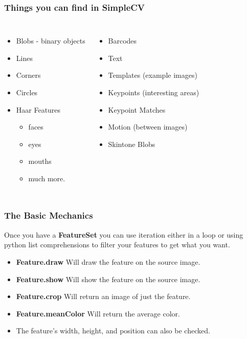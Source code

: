 \documentclass[compress]{beamer}
\begin{document}
\begin{frame}
  \frametitle{Things you can find in SimpleCV}

  \begin{columns}[c] %

    \begin{itemize}
    \item Blobs - binary objects
    \item Lines
    \item Corners
    \item Circles
    \item Haar Features
      \begin{itemize}
        \item faces
        \item eyes
        \item mouths
        \item much more.
        \end{itemize}
    \end{itemize}

    \begin{itemize}
    \item Barcodes
    \item Text
    \item Templates (example images)
    \item Keypoints (interesting areas)
    \item Keypoint Matches
    \item Motion (between images)
    \item Skintone Blobs
    \end{itemize}

  \end{columns}
\end{frame}
\begin{frame}
  \frametitle{The Basic Mechanics}

Once you have a \textbf{FeatureSet} you can use iteration either in a
loop or using python list comprehensions to filter your features to
get what you want. 
\begin{itemize}
\item \textbf{Feature.draw} Will draw the feature on the source image.
\item \textbf{Feature.show} Will show the feature on the source image.
\item \textbf{Feature.crop} Will return an image of just the feature.
\item \textbf{Feature.meanColor} Will return the average color. 
\item The feature's width, height, and position can also be checked.
\end{itemize}
\end{frame}
\end{document}
